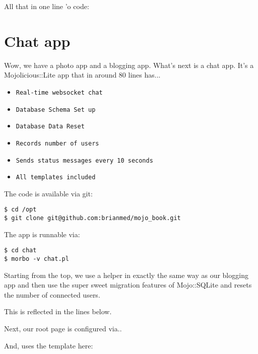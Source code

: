 \documentclass[14pt]{extreport}
\newcommand\Small{\fontsize{12}{13.0}\fontencoding{T1}\selectfont}
\newcommand*\LSTfont{\Small\ttfamily\SetTracking{encoding=*}{-60}\lsstyle}
\begin{document}
All that in one line 'o code:



\section{Chat app}

Wow, we have a photo app and a blogging app.  What's next is a chat app.  It's
a Mojolicious::Lite app that in around 80 lines has...

\begin{itemize} \itemsep1pt \parskip0pt 
\item \verb|Real-time websocket chat|
\item \verb|Database Schema Set up|
\item \verb|Database Data Reset|
\item \verb|Records number of users|
\item \verb|Sends status messages every 10 seconds|
\item \verb|All templates included|
\end{itemize}

The code is available via git:

\begin{lstlisting}[style=BashOutputStyle]
$ cd /opt
$ git clone git@github.com:brianmed/mojo_book.git
\end{lstlisting}

The app is runnable via:

\begin{lstlisting}[style=BashInputStyle]
$ cd chat
$ morbo -v chat.pl
\end{lstlisting}

Starting from the top, we use a helper in exactly the same way as our blogging
app and then use the super sweet migration features of Mojo::SQLite and resets the
number of connected users.

This is reflected in the lines below.



Next, our root page is configured via..



And, uses the template here:


\end{document}

